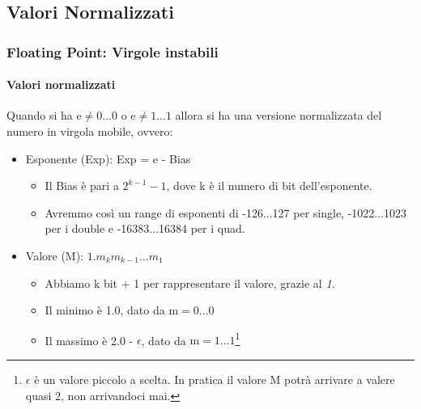 \documentclass{beamer}
\begin{document}
	  \subsection{Valori Normalizzati}
	  \begin{frame}
	    \frametitle{Floating Point: Virgole instabili}
	    \framesubtitle{Valori normalizzati}
	    Quando si ha $\text{e} \neq 0\text{...}0$ o $\text{e} \neq 1\text{...}1$ allora si ha una
	    versione normalizzata del numero in virgola mobile, ovvero:
	    
	    \begin{itemize}
	      \item Esponente (Exp): Exp = e - Bias
	      		\begin{itemize}
	      			\item Il Bias è pari a $2^{k-1} - 1$, dove k è il numero di bit dell'esponente.
	      			\item Avremmo così un range di esponenti di -126...127 per single, -1022...1023 per i double e
	      				-16383...16384 per i quad.
	      		\end{itemize}
	      \item Valore (M): $1.m_{k}m_{k-1}...m_{1}$
	      		\begin{itemize}
	      			\item Abbiamo k bit + 1 per rappresentare il valore, grazie al \emph{1.}
	      			\item Il minimo è 1.0, dato da $\text{m} = 0\text{...}0$
	      			\item Il massimo è 2.0 - $\epsilon$, dato da $\text{m} = 1\text{...}1$\footnote{$\epsilon$ è un valore
	      				piccolo a scelta. In pratica il valore M potrà arrivare a valere quasi 2, non arrivandoci mai.}
	      		\end{itemize}
	    \end{itemize}
	  \end{frame}
\end{document}
